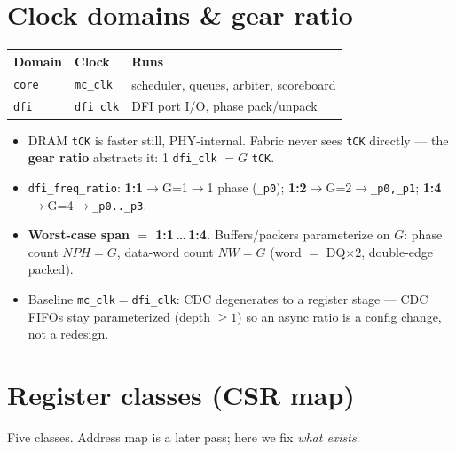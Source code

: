 \documentclass[11pt]{article}
\newcommand{\sig}[1]{\texttt{#1}}
\begin{document}
\section{Clock domains \& gear ratio}

\begin{center}\begin{tabular}{@{}lll@{}}\toprule
Domain & Clock & Runs \\ \midrule
\sig{core} & \sig{mc\_clk} & scheduler, queues, arbiter, scoreboard \\
\sig{dfi} & \sig{dfi\_clk} & DFI port I/O, phase pack/unpack \\ \bottomrule
\end{tabular}\end{center}

\begin{itemize}[nosep,leftmargin=1.4em]
  \item DRAM \sig{tCK} is faster still, PHY-internal. Fabric never sees \sig{tCK} directly ---
    the \textbf{gear ratio} abstracts it: 1 \sig{dfi\_clk} $=G$ \sig{tCK}.
  \item \sig{dfi\_freq\_ratio}: \textbf{1:1}$\to$G=1$\to$1 phase (\sig{\_p0});
    \textbf{1:2}$\to$G=2$\to$\sig{\_p0,\_p1}; \textbf{1:4}$\to$G=4$\to$\sig{\_p0..\_p3}.
  \item \textbf{Worst-case span $=$ 1:1\,\ldots\,1:4.} Buffers/packers parameterize on $G$:
    phase count $NPH=G$, data-word count $NW=G$ (word $=$ DQ$\times2$, double-edge packed).
  \item Baseline \sig{mc\_clk}$=$\sig{dfi\_clk}: CDC degenerates to a register stage --- CDC
    FIFOs stay parameterized (depth $\ge1$) so an async ratio is a config change, not a
    redesign.
\end{itemize}

\section{Register classes (CSR map)}

Five classes. Address map is a later pass; here we fix \emph{what exists}.
\end{document}
